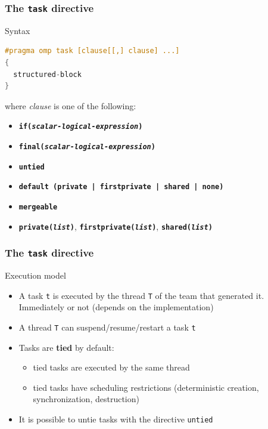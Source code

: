 \begin{frame}[containsverbatim]
\frametitle{The \texttt{task} directive}

\begin{exampleblock}{Syntax}
\begin{lstlisting}[language=C,frame=lines]
#pragma omp task [clause[[,] clause] ...] 
{
  structured-block
}
\end{lstlisting}
where \textit{clause} is one of the following:
\begin{itemize}
\item{\textbf{\texttt{if(\textit{scalar-logical-expression})}}}
\item{\textbf{\texttt{final(\textit{scalar-logical-expression})}}}
\item{\textbf{\texttt{untied}}}
\item{\textbf{\texttt{default (private | firstprivate | shared | none)}}}
\item{\textbf{\texttt{mergeable}}}
\item{\textbf{\texttt{private(\textit{list})}}, \textbf{\texttt{firstprivate(\textit{list})}}, \textbf{\texttt{shared(\textit{list})}}}
\end{itemize}
\end{exampleblock}
\end{frame}



\begin{frame}[containsverbatim]
\frametitle{The \texttt{task} directive}

\begin{exampleblock}{Execution model}
\begin{itemize}
\item{A task \texttt{t} is executed by the thread \texttt{T} of the team that generated it. Immediately or not (depends on the implementation)}
\item{A thread \texttt{T} can suspend/resume/restart a task \texttt{t}}
\item{Tasks are \textbf{tied} by default:
        \begin{itemize}
        \item{tied tasks are executed by the same thread}
        \item{tied tasks have scheduling restrictions (deterministic creation, synchronization, destruction)}
        \end{itemize}
}
\item{It is possible to untie tasks with the directive \texttt{untied}}
\end{itemize}
\end{exampleblock}


\end{frame}


